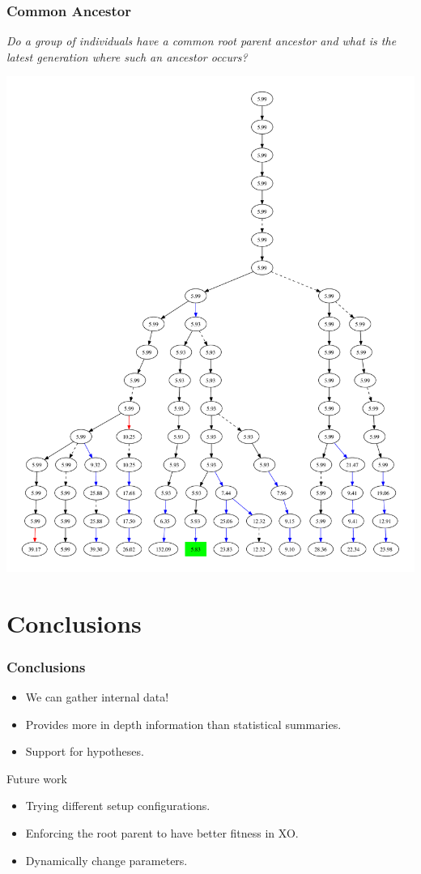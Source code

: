 \documentclass{beamer}
\newcommand{\linespace}{\vskip 0.25cm}
\begin{document}
\begin{frame}
\frametitle{Common Ancestor}
\emph{Do a group of individuals have a common root parent ancestor and what is the latest generation where such an ancestor occurs?}
\begin{center}
\includegraphics[height=0.75\textheight]{subset_confluence_trimmed}
\end{center}

\end{frame}

\section[Conclusions]{Conclusions}

\begin{frame}
\frametitle{Conclusions}

\begin{itemize}
\item We can gather internal data!
\item Provides more in depth information than statistical summaries. 
\item Support for hypotheses.
\end{itemize}
\linespace
\linespace
\linespace
\linespace

Future work
\begin{itemize}
\item Trying different setup configurations.
\item Enforcing the root parent to have better fitness in XO.
\item Dynamically change parameters.
\end{itemize}
\end{frame}
\end{document}
